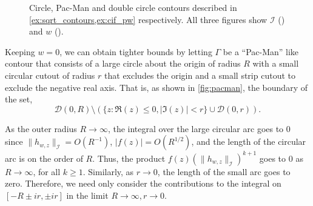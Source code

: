 \begin{figure}[h]
\begin{subfigure}{.35\textwidth}
\label{fig:double_circle}
\end{subfigure}
\caption[Circle, Pac-Man and double circle contours]{%
Circle, Pac-Man and double circle contours described in \cref{ex:sqrt_contours,ex:cif_pw} respectively.
    All three figures show \( \mathcal{I} \) 
    ({\protect{}})
    and \( w \) 
    ({\protect{}}).
}
\label{fig:contours}
\end{figure}

Keeping $w = 0$, we can obtain tighter bounds by letting $\Gamma$ be a ``Pac-Man'' like contour that consists of a large circle about the origin of radius \( R \) with a small circular cutout of radius \( r \) that excludes the origin and a small strip cutout to exclude the negative real axis. %
    That is, as shown in \cref{fig:pacman}, the boundary of the set,
\begin{equation*}
    \mathcal{D}(0,R) \setminus ( \{ z : \Re(z) \leq 0, |\Im(z)| < r \} \cup \mathcal{D}(0,r) ).
\end{equation*}

As the outer radius \( R \rightarrow \infty \), the integral over the large circular arc goes to \( 0 \) since \( \|h_{w,z}\|_{\mathcal{I}} = O(R^{-1}) \), \( | f(z) | = O(R^{1/2}) \), and the length of the circular arc is on the order of \( R \). 
Thus, the product \( f(z) (\| h_{w,z} \|_{\mathcal{I}})^{k+1} \) goes to \( 0 \) as \( R \rightarrow \infty \), for all \( k \geq 1 \).  
Similarly, as \( r\to 0 \), the length of the small arc goes to zero.
Therefore, we need only consider the contributions to the integral on \( [ -R \pm ir, \pm ir] \) in the limit \( R\to \infty, r\to 0 \).


